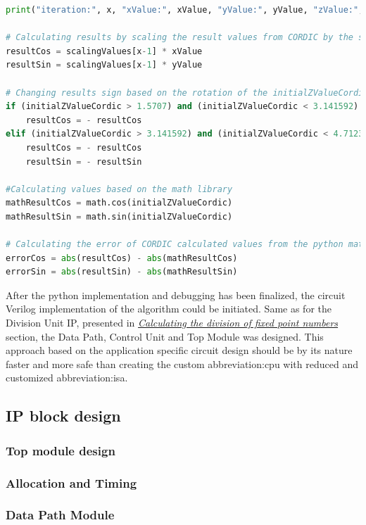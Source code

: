 \documentclass[a4paper, twoside, 11pt]{article}
\begin{document}
\begin{lstlisting}[language={python}, caption={Python code of \gls{abbreviation:cordic} implementation.}, label= {lst:python-cordic}]
    print("iteration:", x, "xValue:", xValue, "yValue:", yValue, "zValue:", zValue, "sigmaValue:", sigmaValue, "\n")

# Calculating results by scaling the result values from CORDIC by the scalingValue which depends on number of iterations which were made
resultCos = scalingValues[x-1] * xValue
resultSin = scalingValues[x-1] * yValue

# Changing results sign based on the rotation of the initialZValueCordic
if (initialZValueCordic > 1.5707) and (initialZValueCordic < 3.141592):
    resultCos = - resultCos
elif (initialZValueCordic > 3.141592) and (initialZValueCordic < 4.7123):
    resultCos = - resultCos
    resultSin = - resultSin

#Calculating values based on the math library
mathResultCos = math.cos(initialZValueCordic)
mathResultSin = math.sin(initialZValueCordic)

# Calculating the error of CORDIC calculated values from the python math functions
errorCos = abs(resultCos) - abs(mathResultCos)
errorSin = abs(resultSin) - abs(mathResultSin)
\end{lstlisting}

\par
After the python implementation and debugging has been finalized, the circuit Verilog implementation of the algorithm could be initiated. Same as for the Division Unit IP, presented in \hyperref[sec:calculating-the-division-of-fixed-point-numbers]{\textit{Calculating the division of fixed point numbers}} section, the Data Path, Control Unit and Top Module was designed. This approach based on the application specific circuit design should be by its nature faster and more safe than creating the custom \gls{abbreviation:cpu} with reduced and customized \gls{abbreviation:isa}.

    \subsection{IP block design}
        \subsubsection{Top module design}
        \subsubsection{Allocation and Timing}
        \subsubsection{Data Path Module}
\end{document}
